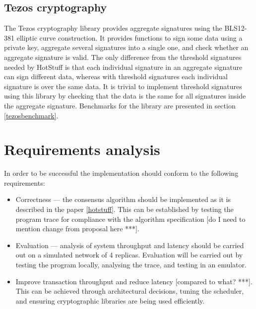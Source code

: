 \subsection{Tezos cryptography} \label{tezos}
The Tezos cryptography library provides aggregate signatures using the BLS12-381 elliptic curve construction. It provides functions to sign some data using a private key, aggregate several signatures into a single one, and check whether an aggregate signature is valid. The only difference from the threshold signatures needed by HotStuff is that each individual signature in an aggregate signature can sign different data, whereas with threshold signatures each individual signature is over the same data. It is trivial to implement threshold signatures using this library by checking that the data is the same for all signatures inside the aggregate signature. Benchmarks for the library are presented in section \ref{tezosbenchmark}.

\section{Requirements analysis} \label{requirements}

In order to be successful the implementation should conform to the following requirements:

\begin{itemize}
	\item Correctness --- the consensus algorithm should be implemented as it is described in the paper \ref{hotstuff}. This can be established by testing the program trace for compliance with the algorithm specification [do I need to mention change from proposal here ***].
	\item Evaluation --- analysis of system throughput and latency should be carried out on a simulated network of 4 replicas. Evaluation will be carried out by testing the program locally, analysing the trace, and testing in an emulator.
	\item Improve transaction throughput and reduce latency [compared to what? ***]. This can be achieved through architectural decisions, tuning the scheduler, and ensuring cryptographic libraries are being used efficiently.
\end{itemize}


